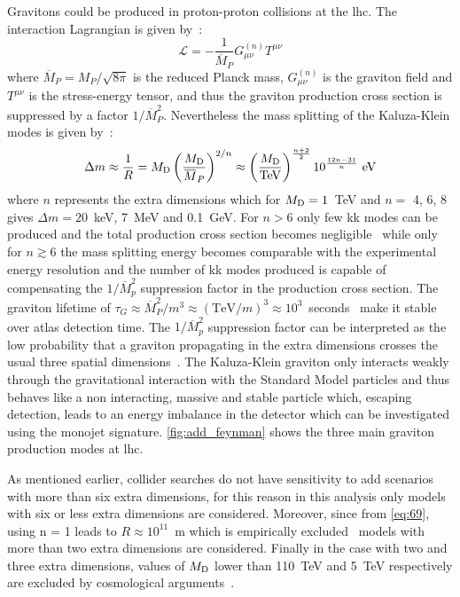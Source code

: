 Gravitons could be produced in proton-proton collisions at the \gls{lhc}. The
interaction Lagrangian is given by~\cite{ADDPhenomenology}:
\begin{equation}
  \label{eq:114}
  \mathcal{L} = - \frac{1}{\overbar{M}_P} G^{(n)}_{\mu\nu} T^{\mu\nu}
\end{equation}
where $\overbar{M}_P = M_P/\sqrt{8 \pi}$ is the reduced Planck mass,
$G^{(n)}_{\mu\nu}$ is the graviton field and $T^{\mu\nu}$ is the stress-energy
tensor, and thus the graviton production cross section is suppressed by a factor
$1/\overbar{M}^2_P$. Nevertheless the mass splitting of the Kaluza-Klein modes
is given by~\cite{ADDPhenomenology}:
\begin{equation}
  \label{eq:115}
  \Delta m \approx \frac{1}{R} = \md \left( \frac{\md}{\overbar{M}_P}
  \right)^{2/n} \approx \left( \frac{\md}{\mathrm{TeV}} \right)^{\frac{n +
  2}{2}} 10^{\frac{12 n - 31}{n}}~\mathrm{eV}
\end{equation}
where $n$ represents the extra dimensions which for $M_\mathrm{D} = 1$~TeV and $n =$ 4,
6, 8 gives $\Delta m = 20$~keV, 7~MeV and 0.1~GeV. For $n > 6$ only few \gls{kk}
modes can be produced and the total production cross section becomes
negligible~\cite{ADDPhenomenology} while only for $n \gtrsim 6$ the mass
splitting energy becomes comparable with the experimental energy resolution and
the number of \gls{kk} modes produced is capable of compensating the
$1/\overbar{M}^2_p$ suppression factor in the production cross section. The
graviton lifetime of
$\tau_G \approx \overbar{M}^2_P/m^3 \approx (\mathrm{TeV}/m)^3 \approx
10^3$~seconds~\cite{ADDPhenomenology} make it stable over \gls{atlas} detection
time. The $1/\overbar{M}^2_p$ suppression factor can be interpreted as the low
probability that a graviton propagating in the extra dimensions crosses the
usual three spatial dimensions~\cite{ADDPhenomenology}. The Kaluza-Klein
graviton only interacts weakly through the gravitational interaction with the
Standard Model particles and thus behaves like a non interacting, massive and
stable particle which, escaping detection, leads to an energy imbalance in the
detector which can be investigated using the monojet
signature. \cref{fig:add_feynman} shows the three main graviton production modes
at \gls{lhc}.

As mentioned earlier, collider searches do not have sensitivity to \gls{add}
scenarios with more than six extra dimensions, for this reason in this analysis
only models with six or less extra dimensions are considered. Moreover, since
from \cref{eq:69}, using n = 1 leads to $R \approx 10^{11}$~m which is
empirically excluded~\cite{ADDPhenomenology} models with more than two extra
dimensions are considered. Finally in the case with two and three extra
dimensions, values of $M_\mathrm{D}$ lower than 110~TeV and 5~TeV respectively are
excluded by cosmological arguments~\cite{ADDCosmology}.

